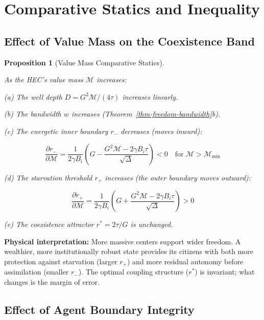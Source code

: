 \documentclass[11pt]{article}
\theoremstyle{plain}
\newtheorem{proposition}[theorem]{Proposition}
\theoremstyle{definition}
\theoremstyle{remark}
\let\origsection\section
\renewcommand{\section}{\needspace{12\baselineskip}\origsection}
\let\origsubsection\subsection
\renewcommand{\subsection}{\needspace{7\baselineskip}\origsubsection}
\begin{document}
\section{Comparative Statics and
Inequality}\label{comparative-statics-and-inequality}

\subsection{Effect of Value Mass on the Coexistence
Band}\label{effect-of-value-mass-on-the-coexistence-band}

\begin{proposition}[Value Mass Comparative Statics]
\label{prop-value-mass-comparative-statics}

As the HEC's value mass $\mathcal{M}$ increases:

(a) The well depth $D = G^2\mathcal{M}/(4\tau)$ increases linearly.

(b) The bandwidth $w$ increases (Theorem~\ref{thm-freedom-bandwidth}b).

(c) The energetic inner boundary $r_-$ decreases (moves inward):

$$\frac{\partial r_-}{\partial \mathcal{M}} = \frac{1}{2\gamma B_i}\left(G - \frac{G^2\mathcal{M} - 2\gamma B_i \tau}{\sqrt{\Delta}}\right) < 0 \quad \text{for } \mathcal{M} > \mathcal{M}_{\min}$$

(d) The starvation threshold $r_+$ increases (the outer boundary moves outward):

$$\frac{\partial r_+}{\partial \mathcal{M}} = \frac{1}{2\gamma B_i}\left(G + \frac{G^2\mathcal{M} - 2\gamma B_i \tau}{\sqrt{\Delta}}\right) > 0$$

(e) The coexistence attractor $r^* = 2\tau/G$ is unchanged.
\end{proposition}

\textbf{Physical interpretation:} More massive centers support wider
freedom. A wealthier, more institutionally robust state provides its
citizens with both more protection against starvation (larger \(r_+\))
and more residual autonomy before assimilation (smaller \(r_-\)). The
optimal coupling structure (\(r^*\)) is invariant; what changes is the
margin of error.

\subsection{Effect of Agent Boundary
Integrity}\label{effect-of-agent-boundary-integrity}
\end{document}
